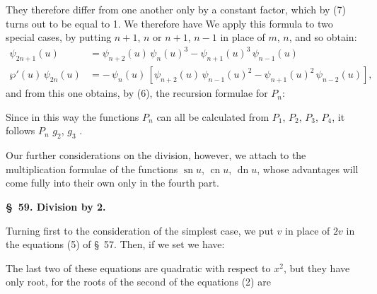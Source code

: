 They therefore differ from one another only by a constant factor,
which by (7) turns out to be equal to 1. We therefore have
We apply this formula to two special cases, by putting $n+1$, $n$
or $n+1$, $n-1$ in place of $m$, $n$, and so obtain:
\[
\begin{aligned}
\psi_{2n+1}(u) &= \psi_{n+2}(u)\,\psi_n(u)^3 - \psi_{n+1}(u)^3\,\psi_{n-1}(u)\\
\wp'(u)\,\psi_{2n}(u) &= -\,\psi_n(u)\,[\psi_{n+2}(u)\,\psi_{n-1}(u)^2 - \psi_{n+1}(u)^2\,\psi_{n-2}(u)],
\end{aligned}
\]
and from this one obtains, by (6), the recursion formulae for $P_n$:

Since in this way the functions $P_n$ can all be calculated from $P_1$, $P_2$, $P_3$, $P_4$,
it follows 
$P_n$  $g_2$, $g_3$ .

Our further considerations on the division, however, we attach
to the multiplication formulae of the functions $\operatorname{sn} u$, $\operatorname{cn} u$,
$\operatorname{dn} u$, whose advantages will come fully into their own only in
the fourth part.

\begin{center}
\textbf{\S~59. Division by 2.}
\end{center}

Turning first to the consideration of the simplest case, we
put $v$ in place of $2v$ in the equations (5) of \S~57. Then, if we
set
we have:

The last two of these equations are quadratic with
respect to $x^2$, but they have only 
root, for the roots of the second of the equations (2) are
